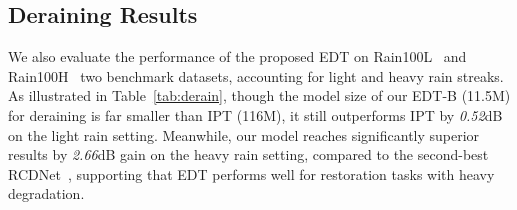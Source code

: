 \documentclass[runningheads]{llncs}
\begin{document}
	
	\subsection{Deraining Results}
	
	We also evaluate the performance of the proposed EDT on Rain100L~\cite{yang2019joint} and Rain100H~\cite{yang2019joint} two benchmark datasets, accounting for light and heavy rain streaks. As illustrated in Table~\ref{tab:derain}, though the model size of our EDT-B (11.5M) for deraining is far smaller than IPT (116M), it still outperforms IPT by \textit{0.52}dB on the light rain setting. Meanwhile, our model reaches significantly superior results by \textit{2.66}dB gain on the heavy rain setting, compared to the second-best RCDNet~\cite{wang2020model}, supporting that EDT performs well for restoration tasks with heavy degradation.
	
	
	\begin{table}[t]
\caption{Quantitative comparison for image deraining on PSNR(dB)/SSIM on the Y channel. ``$\dagger$'' indicates methods with a pre-training.}
		\vspace{-0.1in}
		\renewcommand\arraystretch{1.25}
		\begin{center}
		\end{center}
		\vspace{-0.15in}
\label{tab:derain}
		
	\end{table}
	
\end{document}
